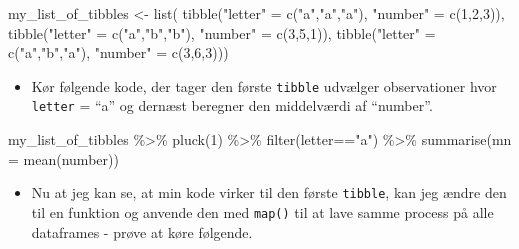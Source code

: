 \documentclass[
]{book}
\newenvironment{Shaded}{\begin{snugshade}}{\end{snugshade}}
\newcommand{\AttributeTok}[1]{\textcolor[rgb]{0.77,0.63,0.00}{#1}}
\newcommand{\DecValTok}[1]{\textcolor[rgb]{0.00,0.00,0.81}{#1}}
\newcommand{\FunctionTok}[1]{\textcolor[rgb]{0.00,0.00,0.00}{#1}}
\newcommand{\NormalTok}[1]{#1}
\newcommand{\OtherTok}[1]{\textcolor[rgb]{0.56,0.35,0.01}{#1}}
\newcommand{\SpecialCharTok}[1]{\textcolor[rgb]{0.00,0.00,0.00}{#1}}
\newcommand{\StringTok}[1]{\textcolor[rgb]{0.31,0.60,0.02}{#1}}
\providecommand{\tightlist}{%
  \setlength{\itemsep}{0pt}\setlength{\parskip}{0pt}}
\begin{document}
\begin{Shaded}
\begin{Highlighting}[]
\NormalTok{my\_list\_of\_tibbles }\OtherTok{\textless{}{-}} \FunctionTok{list}\NormalTok{( }\FunctionTok{tibble}\NormalTok{(}\StringTok{"letter"} \OtherTok{=} \FunctionTok{c}\NormalTok{(}\StringTok{"a"}\NormalTok{,}\StringTok{"a"}\NormalTok{,}\StringTok{"a"}\NormalTok{), }\StringTok{"number"} \OtherTok{=} \FunctionTok{c}\NormalTok{(}\DecValTok{1}\NormalTok{,}\DecValTok{2}\NormalTok{,}\DecValTok{3}\NormalTok{)),}
                            \FunctionTok{tibble}\NormalTok{(}\StringTok{"letter"} \OtherTok{=} \FunctionTok{c}\NormalTok{(}\StringTok{"a"}\NormalTok{,}\StringTok{"b"}\NormalTok{,}\StringTok{"b"}\NormalTok{), }\StringTok{"number"} \OtherTok{=} \FunctionTok{c}\NormalTok{(}\DecValTok{3}\NormalTok{,}\DecValTok{5}\NormalTok{,}\DecValTok{1}\NormalTok{)),}
                            \FunctionTok{tibble}\NormalTok{(}\StringTok{"letter"} \OtherTok{=} \FunctionTok{c}\NormalTok{(}\StringTok{"a"}\NormalTok{,}\StringTok{"b"}\NormalTok{,}\StringTok{"a"}\NormalTok{), }\StringTok{"number"} \OtherTok{=} \FunctionTok{c}\NormalTok{(}\DecValTok{3}\NormalTok{,}\DecValTok{6}\NormalTok{,}\DecValTok{3}\NormalTok{)))}
\end{Highlighting}
\end{Shaded}

\begin{itemize}
\tightlist
\item
  Kør følgende kode, der tager den første \texttt{tibble} udvælger observationer hvor \texttt{letter} = ``a'' og dernæst beregner den middelværdi af ``number''.
\end{itemize}

\begin{Shaded}
\begin{Highlighting}[]
\NormalTok{my\_list\_of\_tibbles }\SpecialCharTok{\%\textgreater{}\%} \FunctionTok{pluck}\NormalTok{(}\DecValTok{1}\NormalTok{) }\SpecialCharTok{\%\textgreater{}\%} \FunctionTok{filter}\NormalTok{(letter}\SpecialCharTok{==}\StringTok{"a"}\NormalTok{) }\SpecialCharTok{\%\textgreater{}\%} \FunctionTok{summarise}\NormalTok{(}\AttributeTok{mn =} \FunctionTok{mean}\NormalTok{(number))}
\end{Highlighting}
\end{Shaded}

\begin{itemize}
\tightlist
\item
  Nu at jeg kan se, at min kode virker til den første \texttt{tibble}, kan jeg ændre den til en funktion og anvende den med \texttt{map()} til at lave samme process på alle dataframes - prøve at køre følgende.
\end{itemize}
\end{document}
